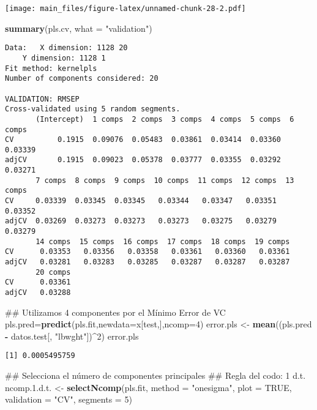 \documentclass[]{article}
\newenvironment{Shaded}{\begin{snugshade}}{\end{snugshade}}
\newcommand{\KeywordTok}[1]{\textcolor[rgb]{0.13,0.29,0.53}{\textbf{#1}}}
\newcommand{\DataTypeTok}[1]{\textcolor[rgb]{0.13,0.29,0.53}{#1}}
\newcommand{\DecValTok}[1]{\textcolor[rgb]{0.00,0.00,0.81}{#1}}
\newcommand{\FloatTok}[1]{\textcolor[rgb]{0.00,0.00,0.81}{#1}}
\newcommand{\StringTok}[1]{\textcolor[rgb]{0.31,0.60,0.02}{#1}}
\newcommand{\OtherTok}[1]{\textcolor[rgb]{0.56,0.35,0.01}{#1}}
\newcommand{\OperatorTok}[1]{\textcolor[rgb]{0.81,0.36,0.00}{\textbf{#1}}}
\newcommand{\NormalTok}[1]{#1}
\begin{document}
\texttt{[image: main\_files/figure-latex/unnamed-chunk-28-2.pdf]}

\begin{Shaded}
\begin{Highlighting}[]
\KeywordTok{summary}\NormalTok{(pls.cv, }\DataTypeTok{what =} \StringTok{"validation"}\NormalTok{)}
\end{Highlighting}
\end{Shaded}

\begin{verbatim}
Data:   X dimension: 1128 20 
    Y dimension: 1128 1
Fit method: kernelpls
Number of components considered: 20

VALIDATION: RMSEP
Cross-validated using 5 random segments.
       (Intercept)  1 comps  2 comps  3 comps  4 comps  5 comps  6 comps
CV          0.1915  0.09076  0.05483  0.03861  0.03414  0.03360  0.03339
adjCV       0.1915  0.09023  0.05378  0.03777  0.03355  0.03292  0.03271
       7 comps  8 comps  9 comps  10 comps  11 comps  12 comps  13 comps
CV     0.03339  0.03345  0.03345   0.03344   0.03347   0.03351   0.03352
adjCV  0.03269  0.03273  0.03273   0.03273   0.03275   0.03279   0.03279
       14 comps  15 comps  16 comps  17 comps  18 comps  19 comps
CV      0.03353   0.03356   0.03358   0.03361   0.03360   0.03361
adjCV   0.03281   0.03283   0.03285   0.03287   0.03287   0.03287
       20 comps
CV      0.03361
adjCV   0.03288
\end{verbatim}

\begin{Shaded}
\begin{Highlighting}[]
\NormalTok{## Utilizamos 4 componentes por el Mínimo Error de VC}
\NormalTok{pls.pred=}\KeywordTok{predict}\NormalTok{(pls.fit,}\DataTypeTok{newdata=}\NormalTok{x[test,],}\DataTypeTok{ncomp=}\DecValTok{4}\NormalTok{)}
\NormalTok{error.pls <-}\StringTok{ }\KeywordTok{mean}\NormalTok{((pls.pred }\OperatorTok{-}\StringTok{ }\NormalTok{datos.test[, }\StringTok{"lbwght"}\NormalTok{])}\OperatorTok{^}\DecValTok{2}\NormalTok{)}
\NormalTok{error.pls}
\end{Highlighting}
\end{Shaded}

\begin{verbatim}
[1] 0.0005495759
\end{verbatim}

\begin{Shaded}
\begin{Highlighting}[]
\NormalTok{## Selecciona el número de componentes principales}
\NormalTok{## Regla del codo: 1 d.t.}
\NormalTok{ncomp.}\FloatTok{1.}\NormalTok{d.t. <-}\StringTok{ }\KeywordTok{selectNcomp}\NormalTok{(pls.fit, }\DataTypeTok{method =} \StringTok{"onesigma"}\NormalTok{, }\DataTypeTok{plot =} \OtherTok{TRUE}\NormalTok{, }\DataTypeTok{validation =} \StringTok{"CV"}\NormalTok{,}
                            \DataTypeTok{segments =} \DecValTok{5}\NormalTok{)}
\end{Highlighting}
\end{Shaded}
\end{document}
